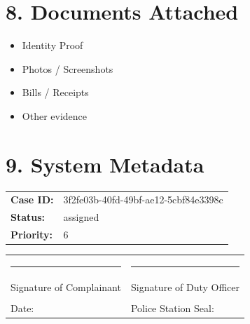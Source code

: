 \documentclass[11pt, a4paper]{article}
\begin{document}
\section{8. Documents Attached}
\begin{itemize}
  \item Identity Proof
  \item Photos / Screenshots
  \item Bills / Receipts
  \item Other evidence
\end{itemize}

\section{9. System Metadata}
\begin{tabular}{ll}
  \textbf{Case ID:} & 3f2fe03b-40fd-49bf-ae12-5cbf84e3398c \\
  \textbf{Status:} & assigned \\
  \textbf{Priority:} & 6 \\
\end{tabular}

\vspace{1cm}
\noindent
\begin{tabular}{@{}p{}p{}@{}}
  \rule{6cm}{0.4pt} & \rule{6cm}{0.4pt} \\
  Signature of Complainant & Signature of Duty Officer \\
  & \\
  Date: & Police Station Seal: \\
\end{tabular}
\end{document}
